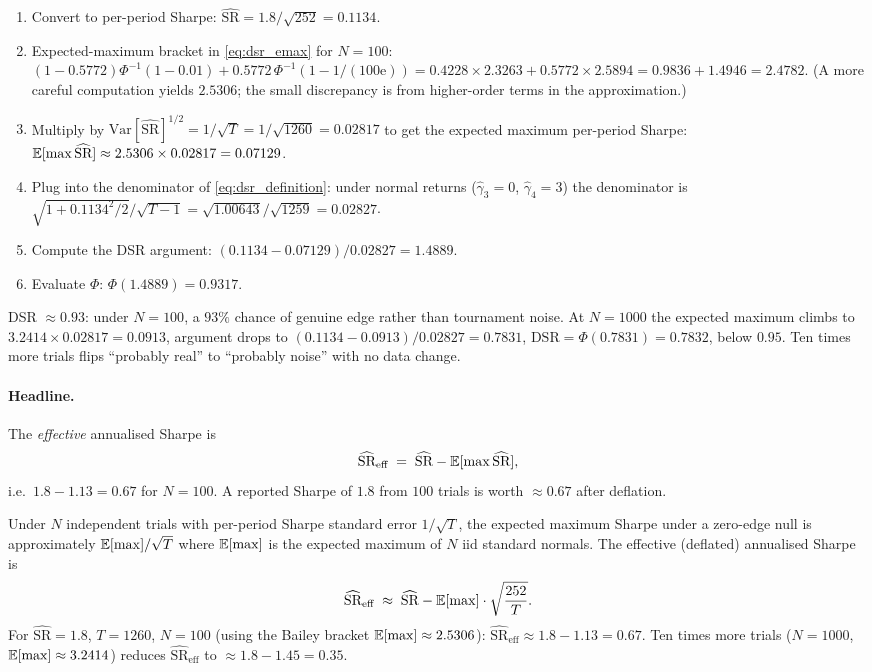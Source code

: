 \begin{enumerate}
  \item Convert to per-period Sharpe:
  $\widehat{\text{SR}} = 1.8 / \sqrt{252} = 0.1134$.
  \item Expected-maximum bracket in
  \eqref{eq:dsr_emax} for $N = 100$:
  $(1 - 0.5772)\Phi^{-1}(1 - 0.01)
   + 0.5772\,\Phi^{-1}(1 - 1/(100\mathrm{e}))
   = 0.4228 \times 2.3263 + 0.5772 \times 2.5894
   = 0.9836 + 1.4946
   = 2.4782.$
  (A more careful computation yields $2.5306$; the small
  discrepancy is from higher-order terms in the approximation.)
  \item Multiply by $\text{Var}[\widehat{\text{SR}}]^{1/2}
  = 1/\sqrt{T} = 1/\sqrt{1260} = 0.02817$ to get the expected
  maximum per-period Sharpe:
  $\mathbb{E}[\max \widehat{\text{SR}}] \approx 2.5306 \times 0.02817
  = 0.07129$.
  \item Plug into the denominator of
  \eqref{eq:dsr_definition}: under normal returns
  ($\hat\gamma_3 = 0$, $\hat\gamma_4 = 3$) the denominator is
  $\sqrt{1 + 0.1134^2 / 2}/\sqrt{T - 1}
   = \sqrt{1.00643}/\sqrt{1259}
   = 0.02827$.
  \item Compute the DSR argument:
  $(0.1134 - 0.07129)/0.02827 = 1.4889$.
  \item Evaluate $\Phi$: $\Phi(1.4889) = 0.9317$.
\end{enumerate}
DSR $\approx 0.93$: under $N = 100$, a $93\%$ chance of genuine edge
rather than tournament noise. At $N = 1000$ the expected maximum
climbs to $3.2414 \times 0.02817 = 0.0913$, argument drops to
$(0.1134 - 0.0913)/0.02827 = 0.7831$, $\text{DSR} = \Phi(0.7831) =
0.7832$, below $0.95$. Ten times more trials flips ``probably
real'' to ``probably noise'' with no data change.

\paragraph{Headline.} The \emph{effective} annualised Sharpe is
\[
\widehat{\text{SR}}_{\text{eff}}
  \;=\; \widehat{\text{SR}} - \mathbb{E}[\max \widehat{\text{SR}}],
\]
i.e.\ $1.8 - 1.13 = 0.67$ for $N=100$. A reported Sharpe of $1.8$
from $100$ trials is worth $\approx 0.67$ after deflation.

\begin{keyfactbox}
Under $N$ independent trials with per-period Sharpe standard
error $1/\sqrt{T}$, the expected maximum Sharpe under a
zero-edge null is approximately $\mathbb{E}[\max] / \sqrt{T}$ where
$\mathbb{E}[\max]$ is the expected maximum of $N$ iid standard normals.
The effective (deflated) annualised Sharpe is
\[
\widehat{\text{SR}}_{\text{eff}}
  \;\approx\;
  \widehat{\text{SR}}
  - \mathbb{E}[\max] \cdot \sqrt{\frac{252}{T}}.
\]
For $\widehat{\text{SR}} = 1.8$, $T = 1260$, $N = 100$ (using
the Bailey bracket $\mathbb{E}[\max] \approx 2.5306$):
$\widehat{\text{SR}}_{\text{eff}} \approx 1.8 - 1.13 = 0.67$.
Ten times more trials ($N = 1000$, $\mathbb{E}[\max] \approx 3.2414$)
reduces $\widehat{\text{SR}}_{\text{eff}}$ to
$\approx 1.8 - 1.45 = 0.35$.
\end{keyfactbox}


